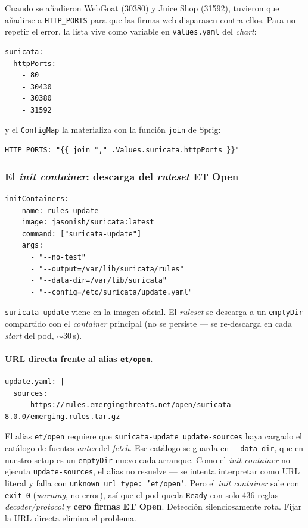 Cuando se añadieron WebGoat (30380) y Juice Shop (31592), tuvieron que añadirse a \texttt{HTTP\_PORTS} para que las firmas web disparasen contra ellos. Para no repetir el error, la lista vive como variable en \texttt{values.yaml} del \emph{chart}:

\begin{lstlisting}[style=yaml]
suricata:
  httpPorts:
    - 80
    - 30430
    - 30380
    - 31592
\end{lstlisting}

y el \texttt{ConfigMap} la materializa con la función \texttt{join} de Sprig:

\begin{lstlisting}[style=yaml]
HTTP_PORTS: "{{ join "," .Values.suricata.httpPorts }}"
\end{lstlisting}

\subsubsection{El \emph{init container}: descarga del \emph{ruleset} ET Open}

\begin{lstlisting}[style=yaml]
initContainers:
  - name: rules-update
    image: jasonish/suricata:latest
    command: ["suricata-update"]
    args:
      - "--no-test"
      - "--output=/var/lib/suricata/rules"
      - "--data-dir=/var/lib/suricata"
      - "--config=/etc/suricata/update.yaml"
\end{lstlisting}

\texttt{suricata-update} viene en la imagen oficial. El \emph{ruleset} se descarga a un \texttt{emptyDir} compartido con el \emph{container} principal (no se persiste --- se re-descarga en cada \emph{start} del pod, $\sim$30\,s).

\paragraph{URL directa frente al alias \texttt{et/open}.}

\begin{lstlisting}[style=yaml]
update.yaml: |
  sources:
    - https://rules.emergingthreats.net/open/suricata-8.0.0/emerging.rules.tar.gz
\end{lstlisting}

El alias \texttt{et/open} requiere que \texttt{suricata-update update-sources} haya cargado el catálogo de fuentes \emph{antes} del \emph{fetch}. Ese catálogo se guarda en \texttt{-{}-data-dir}, que en nuestro setup es un \texttt{emptyDir} nuevo cada arranque. Como el \emph{init container} no ejecuta \texttt{update-sources}, el alias no resuelve --- se intenta interpretar como URL literal y falla con \texttt{unknown url type: 'et/open'}. Pero el \emph{init container} sale con \texttt{exit 0} (\emph{warning}, no error), así que el pod queda \texttt{Ready} con solo 436 reglas \emph{decoder/protocol} y \textbf{cero firmas ET Open}. Detección silenciosamente rota. Fijar la URL directa elimina el problema.

